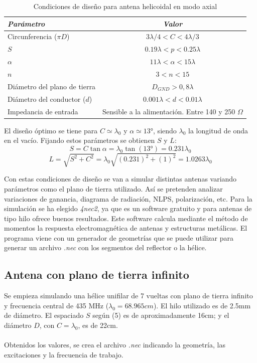 \documentclass[12pt]{article}
\begin{document}
\begin{table}[!h]
\centering
\begin{tabular}{lc}
	\hline 
	\textit{Parámetro} & \textit{Valor} \\ 
	\hline 
	\hline
	Circunferencia ($\pi D$) & $3\lambda/4 < C < 4\lambda/3$  \\ 
	\hline 
	$S$ & $0.19\lambda < p < 0.25\lambda$ \\ 
	\hline 
	$ \alpha $ & $ 11 \lambda < \alpha  < 15 \lambda $ \\ 
	\hline 
	$n$ & $3 < n < 15$  \\ 
	\hline 
	Diámetro del plano de tierra & $D_{GND} > 0,8\lambda$ \\ 
	\hline 
	Diámetro del conductor ($d$)	& $ 0.001\lambda < d < 0.01 \lambda$   \\ 
	\hline 
	Impedancia de entrada & Sensible a la alimentación. Entre 140 y 250 $\Omega$  \\ 
	\hline 
\end{tabular}
\caption{Condiciones de diseño para antena helicoidal en modo axial}
\label{table:condiciones_diseno}
\end{table} 

El diseño óptimo se tiene para $C \simeq \lambda_0$ y $\alpha \simeq 13°$, siendo $\lambda_0$ la longitud de onda en el vacío. Fijando estos parámetros se obtienen $S$ y $L$:\\
\begin{equation}
S = C \tan{\alpha} = \lambda_0 \tan(13°) = 0.231 \lambda_0 
\end{equation}
\begin{equation}
L=\sqrt{S^2 + C^2} = \lambda_0 \sqrt{(0.231)^2 + (1)^2} = 1.0263 \lambda_0
\end{equation}

Con estas condiciones de diseño se van a simular distintas antenas variando parámetros como el plano de tierra utilizado. Así se pretenden analizar variaciones de ganancia, diagrama de radiación, NLPS, polarización, etc. Para la simulación se ha elegido \textit{4nec2}, ya que es un software gratuito y para antenas de tipo hilo ofrece buenos resultados. Este software calcula mediante el método de momentos la respuesta electromagnética de antenas y estructuras metálicas. El programa viene con un generador de geometrías que se puede utilizar para generar un archivo \textit{.nec} con los segmentos del reflector o la hélice.

\subsection{Antena con plano de tierra infinito}
Se empieza simulando una hélice unifilar de 7 vueltas con plano de tierra infinito y frecuencia central de 435 MHz ($\lambda_0 = 68.965cm$). El hilo utilizado es de 2.5mm de diámetro. El espaciado $S$ según (5) es de aproximadamente 16cm; y el diámetro $D$, con $C=\lambda_0$, es de 22cm.\\\\
Obtenidos los valores, se crea el archivo \textit{.nec} indicando la geometría, las excitaciones y la frecuencia de trabajo.\\
\end{document}
